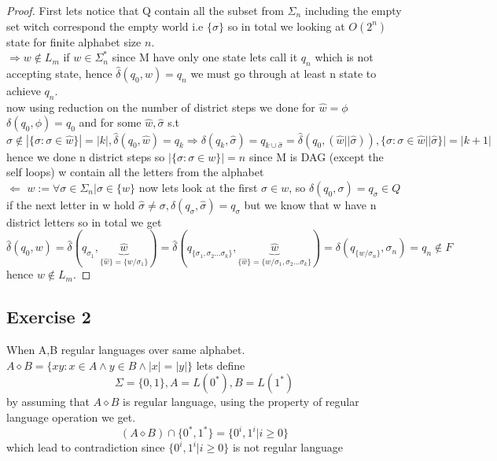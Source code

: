 \documentclass[12pt]{article}
\begin{document}
\begin{proof}
First lets notice that Q contain all the subset from $\Sigma_n$ including the empty set witch correspond the empty world i.e $\lbrace \sigma \rbrace$ so in total we looking at $O(2^n)$ state for finite alphabet size $n$.\\
$\Rightarrow w\notin L_m$ if $w\in \Sigma _n^*$ since M have only one  state  lets call it $q_n$ which is not accepting state, hence $\hat{\delta}(q_0,w)=q_n$ we must go through at least n state to achieve $q_n$.  \\now using reduction on the number of district steps we done for $\hat{w}=\phi$ $\delta(q_0,\phi)=q_0$ and for some $\hat{w},\hat{\sigma}$ s.t\[ \hat{\sigma}\notin|\lbrace \sigma :\sigma \in \hat{w}\rbrace |=|k| , \hat{\delta}(q_0,\hat{w})=q_{k}\Rightarrow \delta(q_k,\hat{\sigma})=q_{k\cup \hat{\sigma}}=\hat{\delta}(q_0,(\hat{w}||\hat{\sigma})), \lbrace \sigma :\sigma \in \hat{w}||\hat{\sigma}\rbrace |=|k+1| \]
 hence we done n district steps so $| \lbrace \sigma :\sigma \in w\rbrace|=n$
 since M is DAG (except the self loops) w contain all the letters from the alphabet\\
 $\Leftarrow$ $w:= \forall \sigma \in \Sigma_n   |\sigma \in \lbrace w \rbrace $ now lets look at the first $\sigma \in w$, so $\delta(q_0,\sigma)=q_{\sigma}\in Q$ if the next letter in w hold $\hat{\sigma}\neq \sigma ,\delta(q_{\sigma},\hat{\sigma})=q_{\sigma}$ but we know that w have n district letters so in total  we get
\[
\hat{\delta}(q_0,w)=\hat{\delta}(q_{\sigma_1},\underbrace{\hat{w}}_{\lbrace \hat{w} \rbrace=\lbrace w/ \sigma_1\rbrace })=\hat{\delta}(q_{\lbrace \sigma_1,\sigma_2\dots \sigma_k \rbrace},\underbrace{\hat{w}}_{\lbrace \hat{w} \rbrace=\lbrace w/ \sigma_1,\sigma_2\dots \sigma_k \rbrace })=\delta(q_{\lbrace w/ \sigma_n \rbrace},\sigma_n)=q_n \notin F
\]  
hence $w\notin L_m$.

\end{proof}
\subsection*{Exercise 2}
When A,B regular languages over same alphabet. $A \diamond B = \lbrace xy : x \in A \wedge y \in B \wedge |x| = |y|\rbrace$ lets define 
\[
\Sigma=\lbrace 0,1 \rbrace, A=L(0^*), B=L(1^*)
\]
by assuming that $ A \diamond B $ is regular language, using the property of regular language operation we get.
 \[(A \diamond B )\cap \lbrace 0^*,1^*\rbrace=\lbrace 0^i,1^i|i\geq 0 \rbrace
 \]
which lead to contradiction since $\lbrace 0^i,1^i|i\geq 0 \rbrace $ is not regular language
\end{document}
